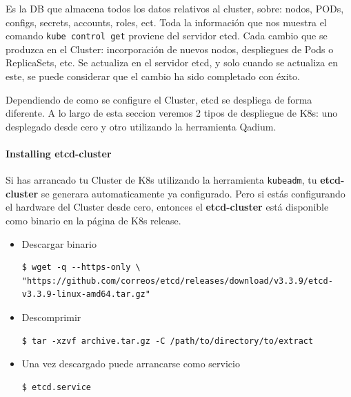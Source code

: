 \documentclass{article}
\newenvironment{codetemplate}[1][]{%
  \mybasecolorbox[#1]
  \itshape
}{%
  \endmybasecolorbox
}
\begin{document}
Es la DB que almacena todos los datos relativos al cluster, sobre: nodos, PODs, configs, secrets, accounts, roles, ect. Toda la información que nos muestra el comando \verb|kube control get| proviene del servidor etcd. Cada cambio que se produzca en el Cluster: incorporación de nuevos nodos, despliegues de Pods o ReplicaSets, etc. Se actualiza en el servidor etcd, y solo cuando se actualiza en este, se puede considerar que el cambio ha sido completado con éxito.

Dependiendo de como se configure el Cluster, etcd se despliega de forma diferente. A lo largo de esta seccion veremos 2 tipos de despliegue de K8s: uno desplegado desde cero y otro utilizando la herramienta Qadium.

\paragraph{Installing etcd-cluster}

Si has arrancado tu Cluster de K8s utilizando la herramienta \verb|kubeadm|, tu \textbf{etcd-cluster} se generara automaticamente ya configurado. Pero si estás configurando el hardware del Cluster desde cero, entonces el \textbf{etcd-cluster} está disponible como binario en la página de K8s release.

\begin{itemize}
    \item Descargar binario
\begin{codetemplate}{}
\begin{verbatim}
$ wget -q --https-only \ 
"https://github.com/correos/etcd/releases/download/v3.3.9/etcd-v3.3.9-linux-amd64.tar.gz"
\end{verbatim}
\end{codetemplate}

    \item Descomprimir
\begin{codetemplate}{}
\begin{verbatim}
$ tar -xzvf archive.tar.gz -C /path/to/directory/to/extract
\end{verbatim}
\end{codetemplate} 

    \item Una vez descargado puede arrancarse como servicio
\begin{codetemplate}{}
\begin{verbatim}
$ etcd.service
\end{verbatim}
\end{codetemplate}
\end{itemize}
\end{document}
